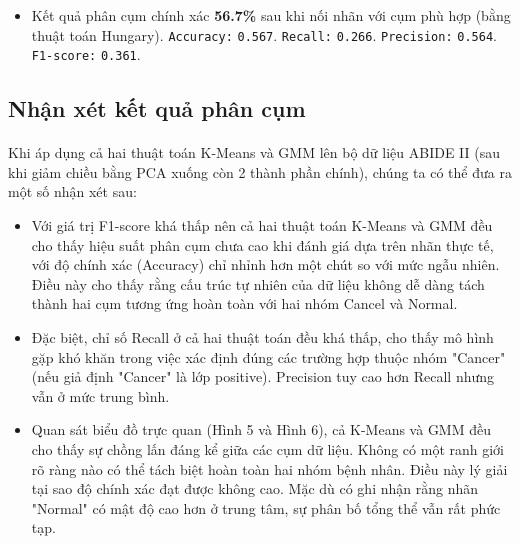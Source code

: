 \begin{itemize}
    \item Kết quả phân cụm chính xác \textbf{56.7\%} sau khi nối nhãn với cụm phù hợp (bằng thuật toán Hungary). \texttt{Accuracy:} \texttt{0.567}. \texttt{Recall:} \texttt{0.266}. \texttt{Precision:} \texttt{0.564}.  \texttt{F1-score:} \texttt{0.361}. 
\end{itemize}

\subsection{Nhận xét kết quả phân cụm}
\paragraph{}{Khi áp dụng cả hai thuật toán K-Means và GMM lên bộ dữ liệu ABIDE II (sau khi giảm chiều bằng PCA xuống còn 2 thành phần chính), chúng ta có thể đưa ra một số nhận xét sau:}

\begin{itemize}
    \item Với giá trị F1-score khá thấp nên cả hai thuật toán K-Means và GMM đều cho thấy hiệu suất phân cụm chưa cao khi đánh giá dựa trên nhãn thực tế, với độ chính xác (Accuracy) chỉ nhỉnh hơn một chút so với mức ngẫu nhiên. Điều này cho thấy rằng cấu trúc tự nhiên của dữ liệu không dễ dàng tách thành hai cụm tương ứng hoàn toàn với hai nhóm Cancel và Normal.
    \item Đặc biệt, chỉ số Recall ở cả hai thuật toán đều khá thấp, cho thấy mô hình gặp khó khăn trong việc xác định đúng các trường hợp thuộc nhóm "Cancer" (nếu giả định "Cancer" là lớp positive). Precision tuy cao hơn Recall nhưng vẫn ở mức trung bình.
    \item Quan sát biểu đồ trực quan (Hình 5 và Hình 6), cả K-Means và GMM đều cho thấy sự chồng lấn đáng kể giữa các cụm dữ liệu. Không có một ranh giới rõ ràng nào có thể tách biệt hoàn toàn hai nhóm bệnh nhân. Điều này lý giải tại sao độ chính xác đạt được không cao. Mặc dù có ghi nhận rằng nhãn "Normal" có mật độ cao hơn ở trung tâm, sự phân bố tổng thể vẫn rất phức tạp.
\end{itemize}

\pagebreak